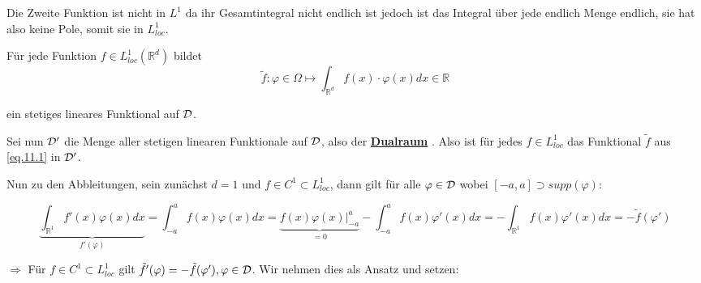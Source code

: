 \documentclass{article}
\theoremstyle{plain}
\theoremstyle{definition}
\numberwithin{equation}{section}
\newcommand{\R}[0] {
\mathbb R
}
\newcommand{\mim}[1] {
\underline{\textbf{#1\index{#1}}}
}
\newcommand{\C}[0]{
    \cdot
}
\begin{document}
Die Zweite Funktion ist nicht in $L^1$ da ihr Gesamtintegral nicht endlich ist jedoch ist das Integral über jede endlich Menge endlich, sie hat also keine Pole, somit sie in $L^1_{loc}$.

Für jede Funktion $f \in L^1_{loc}(\R^d)$ bildet
\begin{equation}\label{eq.11.1}
    \tilde f:\varphi \in \Omega \mapsto \int_{\R^d} f(x) \C \varphi(x) dx \in \R
\end{equation}

ein stetiges lineares Funktional auf $\mathcal{D}$.

Sei nun $\mathcal{D}'$ die Menge aller stetigen linearen Funktionale auf $\mathcal{D}$, also der \mim{Dualraum}. Also ist für jedes $f \in L^1_{loc}$ das Funktional $\tilde f$ aus \eqref{eq.11.1} in $\mathcal{D}'$.

\begin{center}
\end{center}

Nun zu den Abbleitungen, sein zunächst $d=1$ und $f \in C^1 \subset L^1_{loc}$, dann gilt für alle $\varphi \in \mathcal{D}$ wobei $[-a,a] \supset supp(\varphi)$:

\[\underbrace{\int_{\R^1} f'(x) \varphi(x) dx}_{f'(\varphi)} = \int_{-a}^a f(x) \varphi(x) dx = \underbrace{f(x)\varphi(x)|_{-a}^{a}}_{=0} - \int_{-a}^a f(x) \varphi'(x) dx = -\int_{\R^1} f(x) \varphi'(x) dx = -\tilde f(\varphi')\]

$\Rightarrow$ Für $f \in C^1 \subset L^1_{loc}$ gilt $\tilde f'(\varphi) = - \tilde f(\varphi'), \varphi \in \mathcal{D}$. Wir nehmen dies als Ansatz und setzen:
\end{document}
